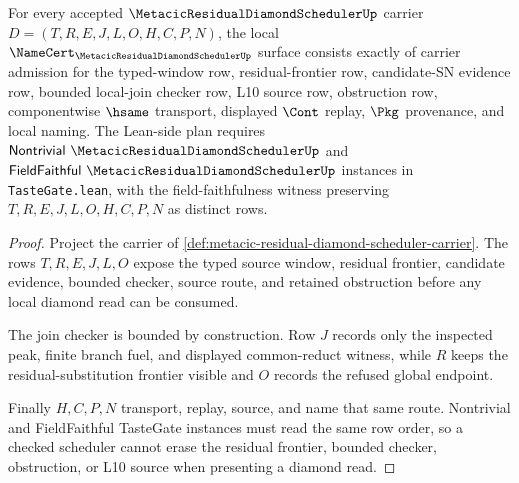 \begin{theorem}
\label{thm:metacic-residual-diamond-scheduler-namecert-obligations}
For every accepted $\MetacicResidualDiamondSchedulerUp$ carrier $D=(T,R,E,J,L,O,H,C,P,N)$, the local $\NameCert_{\MetacicResidualDiamondSchedulerUp}$ surface consists exactly of carrier admission for the typed-window row, residual-frontier row, candidate-SN evidence row, bounded local-join checker row, L10 source row, obstruction row, componentwise $\hsame$ transport, displayed $\Cont$ replay, $\Pkg$ provenance, and local naming. The Lean-side plan requires $\mathsf{Nontrivial}\ \MetacicResidualDiamondSchedulerUp$ and $\mathsf{FieldFaithful}\ \MetacicResidualDiamondSchedulerUp$ instances in \texttt{TasteGate.lean}, with the field-faithfulness witness preserving $T,R,E,J,L,O,H,C,P,N$ as distinct rows.
\end{theorem}
\begin{proof}
Project the carrier of \autoref{def:metacic-residual-diamond-scheduler-carrier}. The rows $T,R,E,J,L,O$ expose the typed source window, residual frontier, candidate evidence, bounded checker, source route, and retained obstruction before any local diamond read can be consumed.

The join checker is bounded by construction. Row $J$ records only the inspected peak, finite branch fuel, and displayed common-reduct witness, while $R$ keeps the residual-substitution frontier visible and $O$ records the refused global endpoint.

Finally $H,C,P,N$ transport, replay, source, and name that same route. Nontrivial and FieldFaithful TasteGate instances must read the same row order, so a checked scheduler cannot erase the residual frontier, bounded checker, obstruction, or L10 source when presenting a diamond read.
\end{proof}


